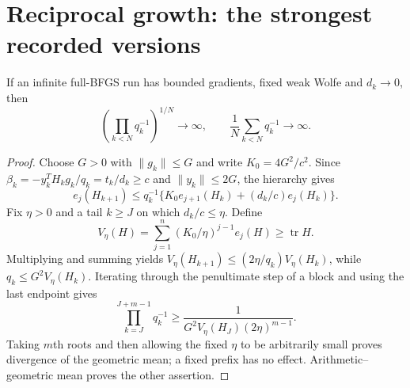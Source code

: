 

\section{Reciprocal growth: the strongest recorded versions}
\label{M:reciprocal}

\begin{theorem}\label{M:average}
If an infinite full-BFGS run has bounded gradients, fixed weak Wolfe and $d_k\to0$, then
\[
 \left(\prod_{k<N}q_k^{-1}\right)^{1/N}\to\infty,
 \qquad\frac1N\sum_{k<N}q_k^{-1}\to\infty.
\]
\end{theorem}
\begin{proof}
Choose $G>0$ with $\|g_k\|\le G$ and write $K_0=4G^2/c^2$. Since $\beta_k=-y_k^TH_kg_k/q_k=t_k/d_k\ge c$ and $\|y_k\|\le2G$, the hierarchy gives
\[
 e_j(H_{k+1})\le q_k^{-1}\{K_0 e_{j+1}(H_k)+(d_k/c)e_j(H_k)\}.
\]
Fix $\eta>0$ and a tail $k\ge J$ on which $d_k/c\le\eta$. Define
\[
 V_\eta(H)=\sum_{j=1}^n(K_0/\eta)^{j-1}e_j(H)\ge\operatorname{tr}H.
\]
Multiplying and summing yields $V_\eta(H_{k+1})\le(2\eta/q_k)V_\eta(H_k)$, while $q_k\le G^2V_\eta(H_k)$. Iterating through the penultimate step of a block and using the last endpoint gives
\[
 \prod_{k=J}^{J+m-1}q_k^{-1}\ge\frac1{G^2V_\eta(H_J)(2\eta)^{m-1}}.
\]
Taking $m$th roots and then allowing the fixed $\eta$ to be arbitrarily small proves divergence of the geometric mean; a fixed prefix has no effect. Arithmetic--geometric mean proves the other assertion.
\end{proof}

